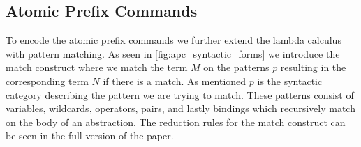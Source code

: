 \documentclass[sigplan,anonymous,review]{acmart}
\begin{document}
    

\subsection{Atomic Prefix Commands}
To encode the atomic prefix commands we further extend the lambda calculus with pattern matching. As seen in \cref{fig:apc_syntactic_forms} we introduce the match construct where we match the term $M$ on the patterns $p$ resulting in the corresponding term $N$ if there is a match. As mentioned $p$ is the syntactic category describing the pattern we are trying to match. These patterns consist of variables, wildcards, operators, pairs, and lastly bindings which recursively match on the body of an abstraction. 
The reduction rules for the match construct can be seen in the full version of the paper.
\end{document}
